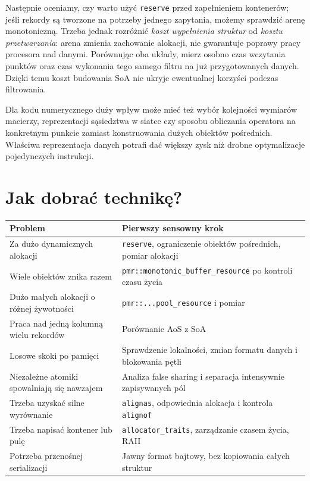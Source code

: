 Następnie oceniamy, czy warto użyć \texttt{reserve} przed zapełnieniem
kontenerów; jeśli rekordy są tworzone na potrzeby jednego zapytania,
możemy sprawdzić arenę monotoniczną. Trzeba jednak rozróżnić
\emph{koszt wypełnienia struktur} od \emph{kosztu przetwarzania}: arena
zmienia zachowanie alokacji, nie gwarantuje poprawy pracy procesora
nad danymi.
Porównując oba układy, mierz osobno czas wczytania punktów oraz czas
wykonania tego samego filtru na już przygotowanych danych. Dzięki temu
koszt budowania SoA nie ukryje ewentualnej korzyści podczas filtrowania.

Dla kodu numerycznego duży wpływ może mieć też wybór kolejności
wymiarów macierzy, reprezentacji sąsiedztwa w siatce czy sposobu
obliczania operatora na konkretnym punkcie zamiast konstruowania
dużych obiektów pośrednich. Właściwa reprezentacja danych potrafi
dać większy zysk niż drobne optymalizacje pojedynczych instrukcji.

\section{Jak dobrać technikę?}

\begin{center}
\small
\begin{tabular}{|p{5.7cm}|p{6.7cm}|}
\hline
\textbf{Problem} & \textbf{Pierwszy sensowny krok} \\
\hline
Za dużo dynamicznych alokacji & \texttt{reserve}, ograniczenie obiektów pośrednich, pomiar alokacji \\
\hline
Wiele obiektów znika razem & \texttt{pmr::monotonic\_buffer\_resource} po kontroli czasu życia \\
\hline
Dużo małych alokacji o różnej żywotności & \texttt{pmr::...pool\_resource} i pomiar \\
\hline
Praca nad jedną kolumną wielu rekordów & Porównanie AoS z SoA \\
\hline
Losowe skoki po pamięci & Sprawdzenie lokalności, zmian formatu danych i blokowania pętli \\
\hline
Niezależne atomiki spowalniają się nawzajem & Analiza false sharing i separacja intensywnie zapisywanych pól \\
\hline
Trzeba uzyskać silne wyrównanie & \texttt{alignas}, odpowiednia alokacja i kontrola \texttt{alignof} \\
\hline
Trzeba napisać kontener lub pulę & \texttt{allocator\_traits}, zarządzanie czasem życia, RAII \\
\hline
Potrzeba przenośnej serializacji & Jawny format bajtowy, bez kopiowania całych struktur \\
\hline
\end{tabular}
\end{center}

